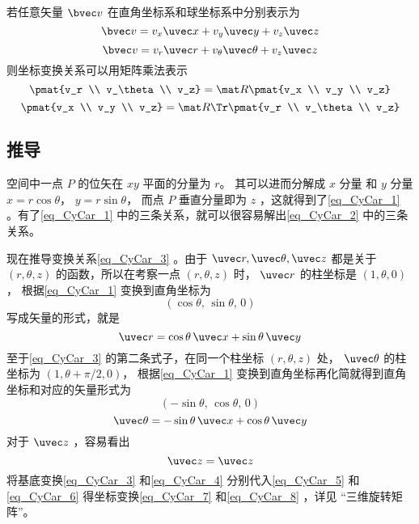 若任意矢量 $\bvec v$ 在直角坐标系和球坐标系中分别表示为
\begin{equation}\label{eq_CyCar_6}
\bvec v = v_x \uvec x + v_y \uvec y + v_z \uvec z
\end{equation}
\begin{equation}\label{eq_CyCar_5}
\bvec v = v_r \uvec r + v_\theta \uvec \theta + v_z \uvec z
\end{equation}
则坐标变换关系可以用矩阵乘法表示
\begin{equation}\label{eq_CyCar_8}
\pmat{v_r \\ v_\theta \\ v_z}
= \mat R \pmat{v_x \\ v_y \\ v_z}
\end{equation}
\begin{equation}\label{eq_CyCar_7}
\pmat{v_x \\ v_y \\ v_z}
= \mat R\Tr \pmat{v_r \\ v_\theta \\ v_z}
\end{equation}
\subsection{推导}
空间中一点 $P$ 的位矢在 $xy$ 平面的分量为 $r$。 其可以进而分解成 $x$ 分量 和 $y$ 分量  $x = r\cos \theta$，  $y = r\sin \theta$， 而点 $P$ 垂直分量即为 $z$ ，这就得到了\autoref{eq_CyCar_1} 。有了\autoref{eq_CyCar_1} 中的三条关系，就可以很容易解出\autoref{eq_CyCar_2} 中的三条关系。

现在推导变换关系\autoref{eq_CyCar_3} 。由于 $\uvec r,\uvec \theta ,\uvec z $ 都是关于 $(r, \theta, z)$ 的函数，所以在考察一点 $(r, \theta, z)$ 时， $\uvec r$ 的柱坐标是 $(1, \theta, 0)$，  根据\autoref{eq_CyCar_1} 变换到直角坐标为
\begin{equation}
(\cos \theta,\,\sin \theta,\,0)
\end{equation}
写成矢量的形式，就是
 \begin{equation}
\uvec r = \cos \theta \,\uvec x + \sin \theta \,\uvec y 
\end{equation}
至于\autoref{eq_CyCar_3} 的第二条式子，在同一个柱坐标 $(r,\theta ,z)$ 处， $\uvec \theta $ 的柱坐标为 $(1, \theta + \pi /2, 0)$， 根据\autoref{eq_CyCar_1} 变换到直角坐标再化简就得到直角坐标和对应的矢量形式为
\begin{equation}
(-\sin \theta ,\,\cos \theta , \,0)
\end{equation}
\begin{equation}
\uvec \theta  = -\sin \theta  \,\uvec x + \cos \theta \,\uvec y
\end{equation}
对于 $\uvec z$ ，容易看出
\begin{equation}
\uvec z = \uvec z
\end{equation}
将基底变换\autoref{eq_CyCar_3}  和\autoref{eq_CyCar_4} 分别代入\autoref{eq_CyCar_5}  和\autoref{eq_CyCar_6} 得坐标变换\autoref{eq_CyCar_7} 和\autoref{eq_CyCar_8} ，详见 “三维旋转矩阵”。

